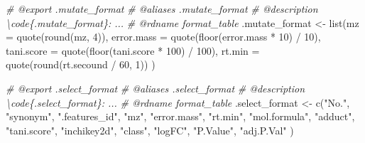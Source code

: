 \documentclass[
]{article}
\newenvironment{Shaded}{\begin{snugshade}}{\end{snugshade}}
\newcommand{\AttributeTok}[1]{\textcolor[rgb]{0.77,0.63,0.00}{#1}}
\newcommand{\CommentTok}[1]{\textcolor[rgb]{0.56,0.35,0.01}{\textit{#1}}}
\newcommand{\DecValTok}[1]{\textcolor[rgb]{0.00,0.00,0.81}{#1}}
\newcommand{\FunctionTok}[1]{\textcolor[rgb]{0.00,0.00,0.00}{#1}}
\newcommand{\NormalTok}[1]{#1}
\newcommand{\OtherTok}[1]{\textcolor[rgb]{0.56,0.35,0.01}{#1}}
\newcommand{\SpecialCharTok}[1]{\textcolor[rgb]{0.00,0.00,0.00}{#1}}
\newcommand{\StringTok}[1]{\textcolor[rgb]{0.31,0.60,0.02}{#1}}
\begin{document}
\begin{Shaded}
\begin{Highlighting}[]
\CommentTok{\#\textquotesingle{} @export .mutate\_format}
\CommentTok{\#\textquotesingle{} @aliases .mutate\_format}
\CommentTok{\#\textquotesingle{} @description \textbackslash{}code\{.mutate\_format\}: ...}
\CommentTok{\#\textquotesingle{} @rdname format\_table}
\NormalTok{.mutate\_format }\OtherTok{\textless{}{-}} 
  \FunctionTok{list}\NormalTok{(}\AttributeTok{mz =} \FunctionTok{quote}\NormalTok{(}\FunctionTok{round}\NormalTok{(mz, }\DecValTok{4}\NormalTok{)),}
    \AttributeTok{error.mass =} \FunctionTok{quote}\NormalTok{(}\FunctionTok{floor}\NormalTok{(error.mass }\SpecialCharTok{*} \DecValTok{10}\NormalTok{) }\SpecialCharTok{/} \DecValTok{10}\NormalTok{),}
    \AttributeTok{tani.score =} \FunctionTok{quote}\NormalTok{(}\FunctionTok{floor}\NormalTok{(tani.score }\SpecialCharTok{*} \DecValTok{100}\NormalTok{) }\SpecialCharTok{/} \DecValTok{100}\NormalTok{),}
    \AttributeTok{rt.min =} \FunctionTok{quote}\NormalTok{(}\FunctionTok{round}\NormalTok{(rt.secound }\SpecialCharTok{/} \DecValTok{60}\NormalTok{, }\DecValTok{1}\NormalTok{))}
\NormalTok{  )}

\CommentTok{\#\textquotesingle{} @export .select\_format}
\CommentTok{\#\textquotesingle{} @aliases .select\_format}
\CommentTok{\#\textquotesingle{} @description \textbackslash{}code\{.select\_format\}: ...}
\CommentTok{\#\textquotesingle{} @rdname format\_table}
\NormalTok{.select\_format }\OtherTok{\textless{}{-}} \FunctionTok{c}\NormalTok{(}\StringTok{"No."}\NormalTok{, }\StringTok{"synonym"}\NormalTok{, }\StringTok{".features\_id"}\NormalTok{, }\StringTok{"mz"}\NormalTok{, }\StringTok{"error.mass"}\NormalTok{,}
  \StringTok{"rt.min"}\NormalTok{, }\StringTok{"mol.formula"}\NormalTok{, }\StringTok{"adduct"}\NormalTok{, }\StringTok{"tani.score"}\NormalTok{, }\StringTok{"inchikey2d"}\NormalTok{,}
  \StringTok{"class"}\NormalTok{, }\StringTok{"logFC"}\NormalTok{, }\StringTok{"P.Value"}\NormalTok{, }\StringTok{"adj.P.Val"}
\NormalTok{)}


\end{Highlighting}
\end{Shaded}
\end{document}
